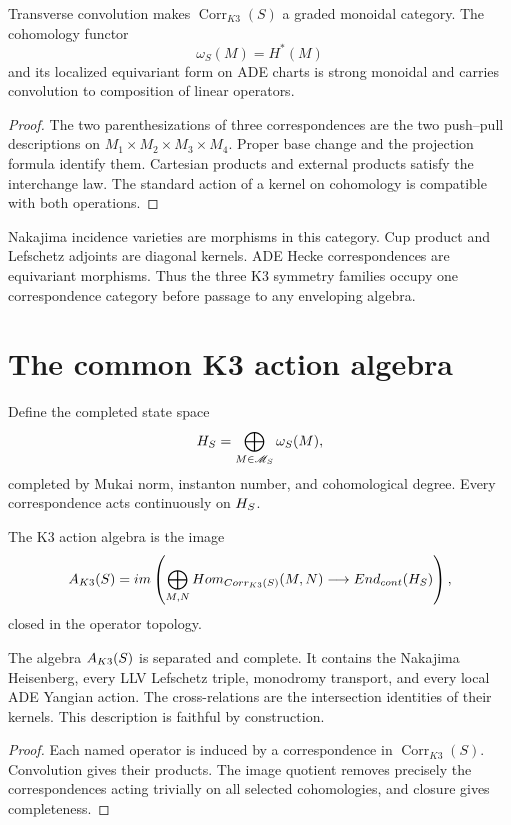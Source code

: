 \begin{theorem}
Transverse convolution makes $\operatorname{Corr}_{K3}(S)$ a graded monoidal category.  The cohomology functor
\[
 \omega_S(M)=H^*(M)
\]
and its localized equivariant form on ADE charts is strong monoidal and carries convolution to composition of linear operators.
\end{theorem}
\begin{proof}
The two parenthesizations of three correspondences are the two push--pull descriptions on $M_1\times M_2\times M_3\times M_4$.  Proper base change and the projection formula identify them.  Cartesian products and external products satisfy the interchange law.  The standard action of a kernel on cohomology is compatible with both operations.
\end{proof}

Nakajima incidence varieties are morphisms in this category.  Cup product and Lefschetz adjoints are diagonal kernels.  ADE Hecke correspondences are equivariant morphisms.  Thus the three K3 symmetry families occupy one correspondence category before passage to any enveloping algebra.

\chapter{The common K3 action algebra}
Define the completed state space
\[
 H_S=
 \bigoplus_{M\in\mathscr M_S}\omega_S(M),
\]
completed by Mukai norm, instanton number, and cohomological degree.  Every correspondence acts continuously on $H_S$.

\begin{definition}
The K3 action algebra is the image
\[
 A_{K3}(S)=
 im\left(
 \bigoplus_{M,N}Hom_{Corr_{K3}(S)}(M,N)
 \longrightarrow End_{cont}(H_S)
 \right),
\]
closed in the operator topology.
\end{definition}

\begin{theorem}
The algebra $A_{K3}(S)$ is separated and complete.  It contains the Nakajima Heisenberg, every LLV Lefschetz triple, monodromy transport, and every local ADE Yangian action.  The cross-relations are the intersection identities of their kernels.  This description is faithful by construction.
\end{theorem}
\begin{proof}
Each named operator is induced by a correspondence in $\operatorname{Corr}_{K3}(S)$.  Convolution gives their products.  The image quotient removes precisely the correspondences acting trivially on all selected cohomologies, and closure gives completeness.
\end{proof}

